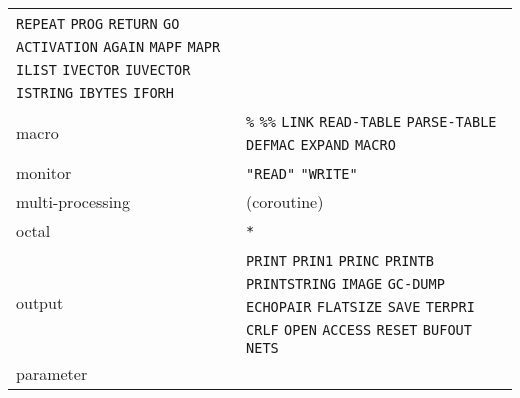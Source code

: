 \documentclass[a4paper,]{article}
\begin{document}
\begin{longtable}[]{@{}ll@{}}
\begin{minipage}[t]{0.83\columnwidth}
\texttt{REPEAT} \texttt{PROG} \texttt{RETURN} \texttt{GO} \texttt{ACTIVATION} \texttt{AGAIN} \texttt{MAPF} \texttt{MAPR}
\texttt{ILIST} \texttt{IVECTOR} \texttt{IUVECTOR} \texttt{ISTRING} \texttt{IBYTES} \texttt{IFORH}\strut
\end{minipage}\tabularnewline
\begin{minipage}[t]{0.11\columnwidth}\raggedright\strut
macro\strut
\end{minipage} & \begin{minipage}[t]{0.83\columnwidth}\raggedright\strut
\texttt{\%} \texttt{\%\%} \texttt{LINK} \texttt{READ-TABLE} \texttt{PARSE-TABLE} \texttt{DEFMAC} \texttt{EXPAND}
\texttt{MACRO}\strut
\end{minipage}\tabularnewline
\begin{minipage}[t]{0.11\columnwidth}\raggedright\strut
monitor\strut
\end{minipage} & \begin{minipage}[t]{0.83\columnwidth}\raggedright\strut
\texttt{"READ"} \texttt{"WRITE"}\strut
\end{minipage}\tabularnewline
\begin{minipage}[t]{0.11\columnwidth}\raggedright\strut
multi-processing\strut
\end{minipage} & \begin{minipage}[t]{0.83\columnwidth}\raggedright\strut
(coroutine)\strut
\end{minipage}\tabularnewline
\begin{minipage}[t]{0.11\columnwidth}\raggedright\strut
octal\strut
\end{minipage} & \begin{minipage}[t]{0.83\columnwidth}\raggedright\strut
\texttt{*}\strut
\end{minipage}\tabularnewline
\begin{minipage}[t]{0.11\columnwidth}\raggedright\strut
output\strut
\end{minipage} & \begin{minipage}[t]{0.83\columnwidth}\raggedright\strut
\texttt{PRINT} \texttt{PRIN1} \texttt{PRINC} \texttt{PRINTB} \texttt{PRINTSTRING} \texttt{IMAGE} \texttt{GC-DUMP}
\texttt{ECHOPAIR} \texttt{FLATSIZE} \texttt{SAVE} \texttt{TERPRI} \texttt{CRLF} \texttt{OPEN} \texttt{ACCESS}
\texttt{RESET} \texttt{BUFOUT} \texttt{NETS}\strut
\end{minipage}\tabularnewline
\begin{minipage}[t]{0.11\columnwidth}\raggedright\strut
parameter\strut
\end{minipage} & \begin{minipage}[t]{0.83\columnwidth}\raggedright\strut

\end{minipage}
\end{longtable}
\end{document}
